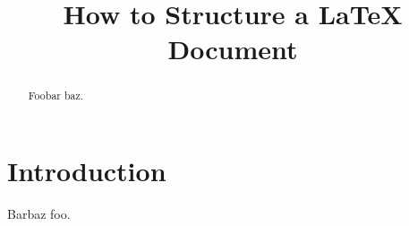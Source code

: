 \documentclass{article}
\begin{document}
\title{How to Structure a \LaTeX{} Document} %
\maketitle

\begin{abstract}
Foobar baz.
\end{abstract}

\section{Introduction}
Barbaz foo.
\end{document}
